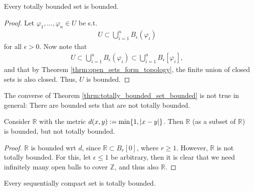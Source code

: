 \begin{theorem}\label{thrm:totally_bounded_set_bounded}
	Every totally bounded set is bounded.
\end{theorem}

\begin{proof}
	Let $\varphi_1, \dots, \varphi_n\in U$ be s.t.
	\begin{align*}
		U\subset \bigcup_{i = 1}^{n}B_{\epsilon}(\varphi_i)
	\end{align*}
	for all $\epsilon > 0$. Now note that
	\begin{align*}
		U\subset \bigcup_{i = 1}^{n}B_{\epsilon}(\varphi_i) \subset \bigcup_{i = 1}^{n}B_{\epsilon}[\varphi_i],
	\end{align*}
	and that by Theorem \ref{thrm:open_sets_form_topology}, the finite union of closed sets is also closed. Thus, $U$ is bounded.
\end{proof}

\begin{remark}
	The converse of Theorem \ref{thrm:totally_bounded_set_bounded} is not true in general: There are bounded sets that are not totally bounded.
\end{remark}

\begin{exmp}
	Consider $\mathbb R$ with the metric $d(x, y) := \min\{ 1, \left\vert x - y \right\vert \}$. Then $\mathbb R$ (as a subset of $\mathbb R$) is bounded, but not totally bounded.
\end{exmp}

\begin{proof}
	$\mathbb R$ is bounded wrt $d$, since $\mathbb R \subset B_{r}[0]$, where $r \geq 1$. However, $\mathbb R$ is not totally bounded. For this, let $\epsilon\leq 1$ be arbitrary, then it is clear that we need infinitely many open balls to cover $\mathbb Z$, and thus also $\mathbb R$.
\end{proof}

\begin{theorem}\label{thrm:seq_compact_set_tot_bound}
	Every sequentially compact set is totally bounded.
\end{theorem}


